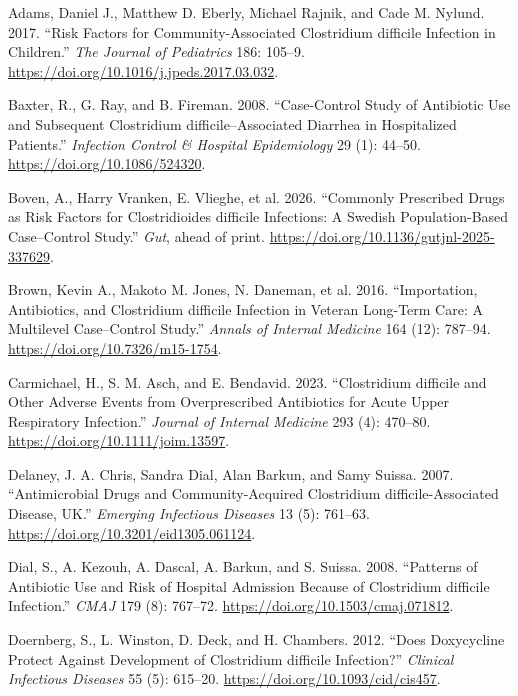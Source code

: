 \documentclass[
  letterpaper,
  DIV=11,
  numbers=noendperiod]{scrartcl}
\newlength{\cslhangindent}
\newenvironment{CSLReferences}[2] %
 {\begin{list}{}{%
  \setlength{\itemindent}{0pt}
  \setlength{\leftmargin}{0pt}
  \setlength{\parsep}{0pt}
  \ifodd #1
   \setlength{\leftmargin}{\cslhangindent}
   \setlength{\itemindent}{-1\cslhangindent}
  \fi
  \setlength{\itemsep}{#2\baselineskip}}}
 {\end{list}}
\begin{document}
\protect{}\label{refs}
\begin{CSLReferences}{1}{1}
Adams, Daniel J., Matthew D. Eberly, Michael Rajnik, and Cade M. Nylund.
2017. {``Risk Factors for Community-Associated {Clostridium difficile}
Infection in Children.''} \emph{The Journal of Pediatrics} 186: 105--9.
\url{https://doi.org/10.1016/j.jpeds.2017.03.032}.

Baxter, R., G. Ray, and B. Fireman. 2008. {``Case-Control Study of
Antibiotic Use and Subsequent {Clostridium difficile}--Associated
Diarrhea in Hospitalized Patients.''} \emph{Infection Control \&
Hospital Epidemiology} 29 (1): 44--50.
\url{https://doi.org/10.1086/524320}.

Boven, A., Harry Vranken, E. Vlieghe, et al. 2026. {``Commonly
Prescribed Drugs as Risk Factors for {Clostridioides difficile}
Infections: A {Swedish} Population-Based Case--Control Study.''}
\emph{Gut}, ahead of print.
\url{https://doi.org/10.1136/gutjnl-2025-337629}.

Brown, Kevin A., Makoto M. Jones, N. Daneman, et al. 2016.
{``Importation, Antibiotics, and {Clostridium difficile} Infection in
Veteran Long-Term Care: A Multilevel Case--Control Study.''}
\emph{Annals of Internal Medicine} 164 (12): 787--94.
\url{https://doi.org/10.7326/m15-1754}.

Carmichael, H., S. M. Asch, and E. Bendavid. 2023. {``{Clostridium
difficile} and Other Adverse Events from Overprescribed Antibiotics for
Acute Upper Respiratory Infection.''} \emph{Journal of Internal
Medicine} 293 (4): 470--80. \url{https://doi.org/10.1111/joim.13597}.

Delaney, J. A. Chris, Sandra Dial, Alan Barkun, and Samy Suissa. 2007.
{``Antimicrobial Drugs and Community-Acquired {Clostridium
difficile}-Associated Disease, {UK}.''} \emph{Emerging Infectious
Diseases} 13 (5): 761--63. \url{https://doi.org/10.3201/eid1305.061124}.

Dial, S., A. Kezouh, A. Dascal, A. Barkun, and S. Suissa. 2008.
{``Patterns of Antibiotic Use and Risk of Hospital Admission Because of
{Clostridium difficile} Infection.''} \emph{CMAJ} 179 (8): 767--72.
\url{https://doi.org/10.1503/cmaj.071812}.

Doernberg, S., L. Winston, D. Deck, and H. Chambers. 2012. {``Does
Doxycycline Protect Against Development of {Clostridium difficile}
Infection?''} \emph{Clinical Infectious Diseases} 55 (5): 615--20.
\url{https://doi.org/10.1093/cid/cis457}.


\end{CSLReferences}
\end{document}
